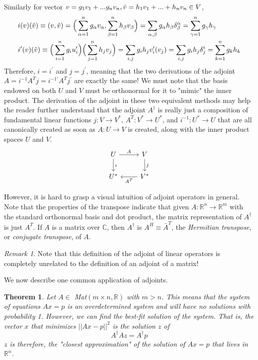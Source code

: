 \documentclass{article}
\newtheorem{theorem}{Theorem}[section]
\theoremstyle{remark}
\newtheorem*{remark}{Remark}
\theoremstyle{definition}
\begin{document}
    Similarly for vector $v = g_1 v_1 + ... g_n v_n, \Tilde{v} = h_1 v_1 + ... + h_n v_n \in V$, 
    \begin{align*}
        &i(v)(\Tilde{v}) \equiv (v, \Tilde{v}) = \Big(\sum_{\alpha = 1}^n g_\alpha v_\alpha, \sum_{\beta = 1}^n h_\beta v_\beta \Big) = \sum_{\alpha, \beta} g_\alpha h_\beta \delta^\alpha_\beta = \sum_{\gamma=1}^n g_\gamma h_\gamma \\
        &i^\prime(v)(\Tilde{v}) \equiv \Big(\sum_{i=1}^n g_i u_i^\prime \Big) \Big( \sum_{j=1}^n h_j v_j \Big) = \sum_{i, j} g_i h_j v_i^\prime (v_j) = \sum_{i, j} g_i h_j \delta^i_j = \sum_{k=1}^n g_k h_k
    \end{align*}
    Therefore, $i = i^\prime$ and $j = j^\prime$, meaning that the two derivations of the adjoint $A = i^{-1} A^T j = i^{-1 \prime} A^T j^\prime$ are exactly the same! We must note that the basis endowed on both $U$ and $V$ must be orthonormal for it to "mimic" the inner product. The derivation of the adjoint in these two equivalent methods may help the reader further understand that the adjoint $A^\dagger$ is really just a composition of fundamental linear functions $j: V \longrightarrow V^*$, $A^T: V^* \longrightarrow U^*$, and $i^{-1}: U^* \longrightarrow U$ that are all canonically created as soon as $A: U \longrightarrow V$ is created, along with the inner product spaces $U$ and $V$. 
    \[
      \begin{tikzcd}
        U \arrow{r}{A} \arrow{d}{i} & V \arrow{d}{j}\\
        U^* & V^* \arrow{l}{A^T}
      \end{tikzcd}
    \]

    However, it is hard to grasp a visual intuition of adjoint operators in general. Note that the properties of the transpose indicate that given $A: \mathbb{R}^n \longrightarrow \mathbb{R}^m$ with the standard orthonormal basis and dot product, the matrix representation of $A^\dagger$ is just $A^T$. If $A$ is a matrix over $\mathbb{C}$, then $A^\dagger$ is $A^H \equiv \bar{A}^T$, the \textit{Hermitian transpose}, or \textit{conjugate transpose}, of $A$. 

    \begin{remark}
    Note that this definition of the adjoint of linear operators is completely unrelated to the definition of an adjoint of a matrix! 
    \end{remark}

    We now describe one common application of adjoints. 
    \begin{theorem}
    Let $A \in$ Mat$(m \times n, \mathbb{R})$ with $m > n$. This means that the system of equations $A x = p$ is an overdetermined system and will have no solutions with probability 1. However, we can find the \textit{best-fit solution} of the system. That is, the vector $x$ that minimizes $||A x -p||^2$ is the solution $z$ of 
    \[ A^\dagger A z = A^\dagger p\]
    $z$ is therefore, the "closest approximation" of the solution of $A x = p$ that lives in $\mathbb{R}^n$. 
    \end{theorem}
\end{document}
